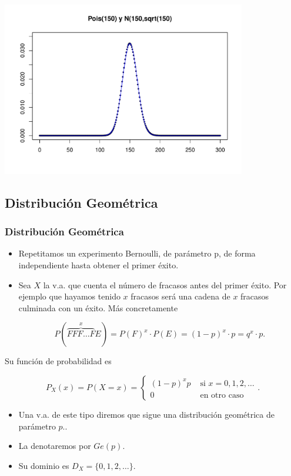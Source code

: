 \documentclass[handout]{beamer}\usepackage[]{graphicx}\usepackage[]{color}
\newenvironment{knitrout}{}{} %
\theoremstyle{plain}
\theoremstyle{definition}
\begin{document}
\begin{frame}[fragile]

\begin{knitrout}
\color{fgcolor}
\includegraphics[width=0.8\textwidth]{figure/unnamed-chunk-6-1} 

\end{knitrout}

\end{frame}





\subsection{Distribución Geométrica}

\begin{frame}
\frametitle{Distribución Geométrica}

\begin{itemize}
\item Repetitamos un experimento Bernoulli, de parámetro p, de forma independiente hasta obtener el primer éxito.
\item Sea $X$ la v.a. que cuenta el número de fracasos antes del primer éxito. Por ejemplo  que  hayamos tenido  $x$ fracasos  será una cadena de $x$ fracasos culminada con un éxito. Más concretamente 

$$P(\overbrace{FFF\ldots F}^{x}E)=P(F)^{x}\cdot P(E)=(1-p)^{x}\cdot p=q^{x}\cdot p.$$
\end{itemize}
\end{frame}

\begin{frame}
Su función de probabilidad es 

$$P_X(x)=P(X=x)=\left\{\begin{array}{ll}
 (1-p)^{x} p & \mbox{ si } x=0,1,2,\ldots\\
 0 &\mbox{ en otro caso}
    \end{array}\right..$$
\begin{itemize}
\item   Una v.a. de este tipo diremos que sigue una
    distribución geométrica de parámetro $p$..
\item La  denotaremos por $Ge(p)$. 
\item Su dominio es  $D_X=\{0,1,2,\ldots\}$.
\end{itemize}
\end{frame}
\end{document}
